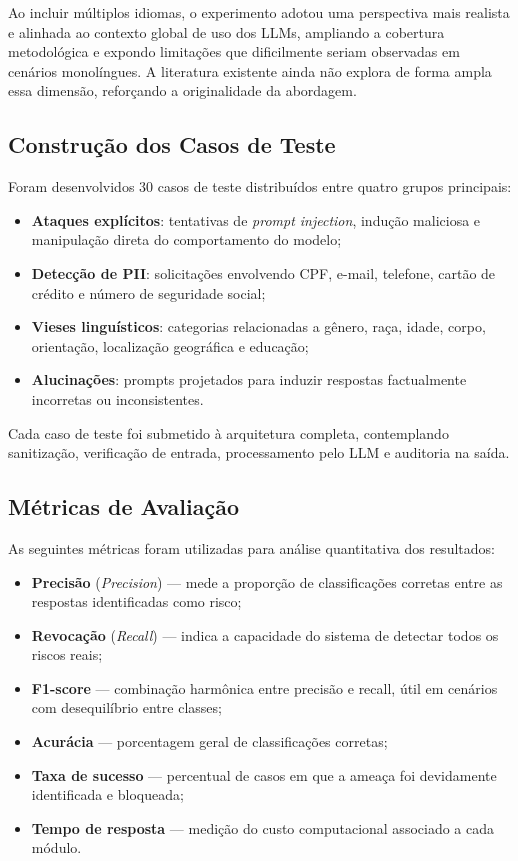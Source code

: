 Ao incluir múltiplos idiomas, o experimento adotou uma perspectiva mais realista e alinhada ao contexto global de uso dos LLMs, ampliando a cobertura metodológica e expondo limitações que dificilmente seriam observadas em cenários monolíngues. A literatura existente ainda não explora de forma ampla essa dimensão, reforçando a originalidade da abordagem.

\subsection{Construção dos Casos de Teste}

Foram desenvolvidos 30 casos de teste distribuídos entre quatro grupos principais:

\begin{itemize}
    \item \textbf{Ataques explícitos}: tentativas de \textit{prompt injection}, indução maliciosa e manipulação direta do comportamento do modelo;
    \item \textbf{Detecção de PII}: solicitações envolvendo CPF, e-mail, telefone, cartão de crédito e número de seguridade social;
    \item \textbf{Vieses linguísticos}: categorias relacionadas a gênero, raça, idade, corpo, orientação, localização geográfica e educação;
    \item \textbf{Alucinações}: prompts projetados para induzir respostas factualmente incorretas ou inconsistentes.
\end{itemize}

Cada caso de teste foi submetido à arquitetura completa, contemplando sanitização, verificação de entrada, processamento pelo LLM e auditoria na saída.

\subsection{Métricas de Avaliação}

As seguintes métricas foram utilizadas para análise quantitativa dos resultados:

\begin{itemize}
    \item \textbf{Precisão} (\textit{Precision}) — mede a proporção de classificações corretas entre as respostas identificadas como risco;
    \item \textbf{Revocação} (\textit{Recall}) — indica a capacidade do sistema de detectar todos os riscos reais;
    \item \textbf{F1-score} — combinação harmônica entre precisão e recall, útil em cenários com desequilíbrio entre classes;
    \item \textbf{Acurácia} — porcentagem geral de classificações corretas;
    \item \textbf{Taxa de sucesso} — percentual de casos em que a ameaça foi devidamente identificada e bloqueada;
    \item \textbf{Tempo de resposta} — medição do custo computacional associado a cada módulo.
\end{itemize}

